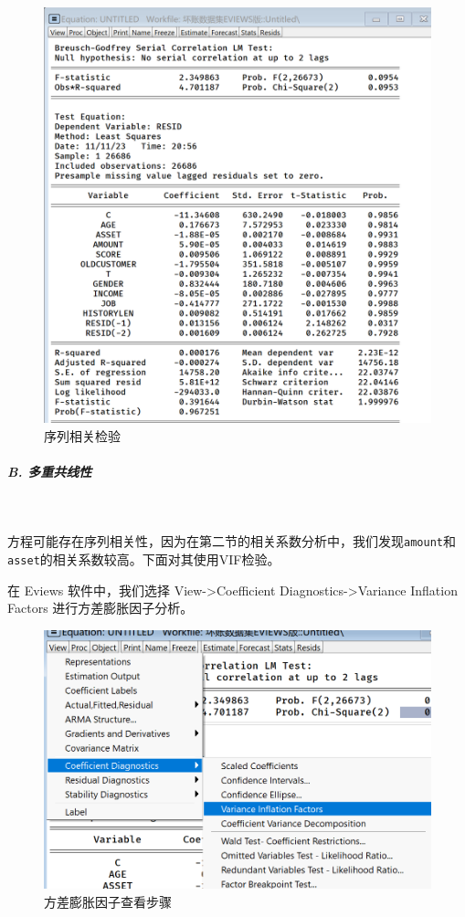 \documentclass[13.5pt,hyperref,a4paper,UTF8]{ctexart}
\begin{document}
\begin{figure}[H]
    \centering
    \includegraphics[width=1\linewidth]{figures//3回归//回归2/II序列相关检验.png}
    \caption{序列相关检验}
    \label{序列相关检验II}
\end{figure}


\subparagraph {B. 多重共线性}
\

方程可能存在序列相关性，因为在第二节的相关系数分析中，我们发现\texttt{amount}和\texttt{asset}的相关系数较高。下面对其使用VIF检验。

在 Eviews 软件中，我们选择 View->Coefficient Diagnostics->Variance Inflation Factors 进行方差膨胀因子分析。

\begin{figure}[H]
    \centering
    \includegraphics[width=0.5\linewidth]{figures//3回归//回归2/VIF步骤.png}
    \caption{方差膨胀因子查看步骤}
    \label{VIF步骤}
\end{figure}
\end{document}
